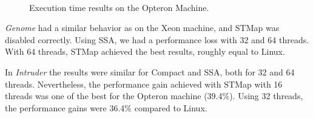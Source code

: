 \begin{figure}[!tb]
{	}
	\\
	\caption{Execution time results on the Opteron Machine.}
	\label{fig:ResultsOnlineOpteron}
\end{figure}

\emph{Genome} had a similar behavior as on the Xeon machine, and STMap was disabled correctly. Using SSA, we had a performance loss with 32 and 64 threads. With 64 threads, STMap achieved the best results, roughly equal to Linux.


In \emph{Intruder} the results were similar for Compact and SSA, both for 32 and 64 threads. Nevertheless, the performance gain achieved with STMap with 16 threads was one of the best for the Opteron machine (39.4\%). Using 32 threads, the performance gains were 36.4\% compared to Linux.


